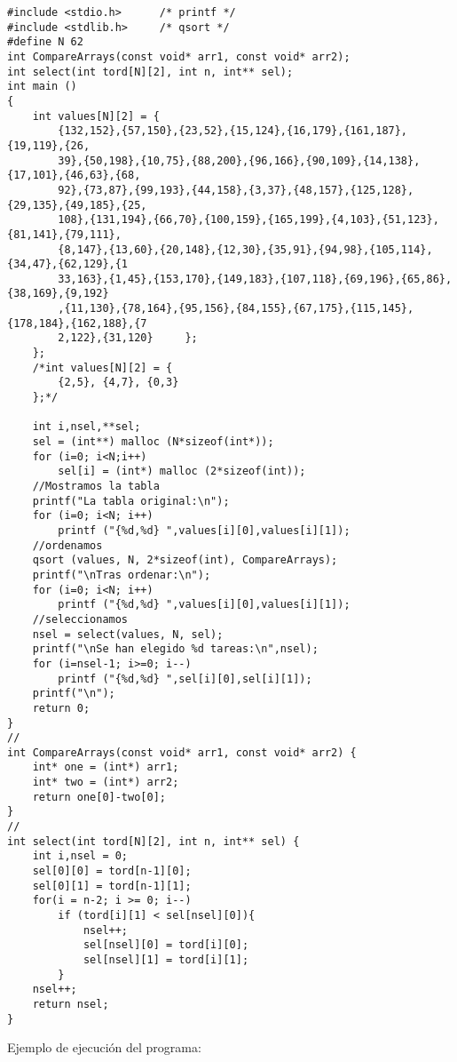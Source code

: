 \documentclass[10pt,a4paper]{article}
\begin{document}
\begin{verbatim}
#include <stdio.h>      /* printf */
#include <stdlib.h>     /* qsort */
#define N 62
int CompareArrays(const void* arr1, const void* arr2);
int select(int tord[N][2], int n, int** sel);
int main ()
{
	int values[N][2] = {
		{132,152},{57,150},{23,52},{15,124},{16,179},{161,187},{19,119},{26,
		39},{50,198},{10,75},{88,200},{96,166},{90,109},{14,138},{17,101},{46,63},{68,
		92},{73,87},{99,193},{44,158},{3,37},{48,157},{125,128},{29,135},{49,185},{25,
		108},{131,194},{66,70},{100,159},{165,199},{4,103},{51,123},{81,141},{79,111},
		{8,147},{13,60},{20,148},{12,30},{35,91},{94,98},{105,114},{34,47},{62,129},{1
		33,163},{1,45},{153,170},{149,183},{107,118},{69,196},{65,86},{38,169},{9,192}
		,{11,130},{78,164},{95,156},{84,155},{67,175},{115,145},{178,184},{162,188},{7
		2,122},{31,120}     };
	};
	/*int values[N][2] = { 
		{2,5}, {4,7}, {0,3}
	};*/

	int i,nsel,**sel;
	sel = (int**) malloc (N*sizeof(int*));
	for (i=0; i<N;i++)
		sel[i] = (int*) malloc (2*sizeof(int));
	//Mostramos la tabla
	printf("La tabla original:\n");
	for (i=0; i<N; i++)
		printf ("{%d,%d} ",values[i][0],values[i][1]);
	//ordenamos
	qsort (values, N, 2*sizeof(int), CompareArrays);
	printf("\nTras ordenar:\n");
	for (i=0; i<N; i++)
		printf ("{%d,%d} ",values[i][0],values[i][1]);
	//seleccionamos
	nsel = select(values, N, sel);
	printf("\nSe han elegido %d tareas:\n",nsel);
	for (i=nsel-1; i>=0; i--)
		printf ("{%d,%d} ",sel[i][0],sel[i][1]);
	printf("\n");
	return 0;
}
//
int CompareArrays(const void* arr1, const void* arr2) {
	int* one = (int*) arr1;
	int* two = (int*) arr2;
	return one[0]-two[0];
}
//
int select(int tord[N][2], int n, int** sel) {
	int i,nsel = 0;
	sel[0][0] = tord[n-1][0];
	sel[0][1] = tord[n-1][1];
	for(i = n-2; i >= 0; i--)
		if (tord[i][1] < sel[nsel][0]){
			nsel++;
			sel[nsel][0] = tord[i][0];
			sel[nsel][1] = tord[i][1];
		}
	nsel++;
	return nsel;
}
\end{verbatim}
Ejemplo de ejecución del programa:
\end{document}
